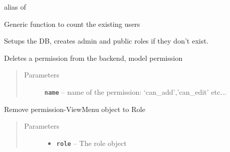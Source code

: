 \documentclass[letterpaper,10pt,english]{sphinxmanual}
\begin{document}
\begin{fulllineitems}
\begin{fulllineitems}
alias of 

\end{fulllineitems}


\begin{fulllineitems}
\label{api:flask.ext.appbuilder.security.manager.BaseSecurityManager.count_users}
Generic function to count the existing users

\end{fulllineitems}


\begin{fulllineitems}
\label{api:flask.ext.appbuilder.security.manager.BaseSecurityManager.create_db}
Setups the DB, creates admin and public roles if they don't exist.

\end{fulllineitems}


\begin{fulllineitems}
\label{api:flask.ext.appbuilder.security.manager.BaseSecurityManager.del_permission}
Deletes a permission from the backend, model permission
\begin{quote}\begin{description}
\item[{Parameters}] \leavevmode
\textbf{\texttt{name}} -- name of the permission: `can\_add','can\_edit' etc...

\end{description}\end{quote}

\end{fulllineitems}


\begin{fulllineitems}
\label{api:flask.ext.appbuilder.security.manager.BaseSecurityManager.del_permission_role}
Remove permission-ViewMenu object to Role
\begin{quote}\begin{description}
\item[{Parameters}] \leavevmode\begin{itemize}
\item {} 
\textbf{\texttt{role}} -- The role object


\end{itemize}
\end{description}
\end{quote}
\end{fulllineitems}
\end{fulllineitems}
\end{document}
